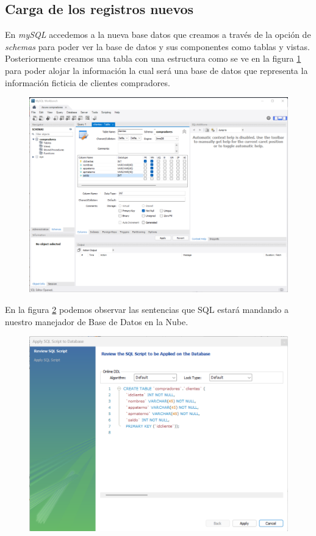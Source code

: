 \documentclass[12pt,a4paper]{article}
\begin{document}
\subsection{Carga de los registros nuevos}

En \textit{mySQL} accedemos a la nueva base datos que creamos a través de la opción de \textit{schemas} para poder ver la base de datos y sus componentes como tablas y vistas. Posteriormente creamos una tabla con una estructura como se ve en la figura \ref{fig:1_3_1_Azure_DBMS} para poder alojar la información la cual será una base de datos que representa la información ficticia de clientes compradores.

\begin{figure}[H]
    \centering
    \includegraphics[width=.6\linewidth]{M4_Servicios_Cómputo_en_la_Nube/Tarea_6_Creación_sistema_administración_Base_de_Datos/reporte/figuras/1_3_1_Azure_DBMS.png}
    \label{fig:1_3_1_Azure_DBMS}
\end{figure}


En la figura \ref{fig:1_3_2_Azure_DBMS} podemos observar las sentencias que SQL estará mandando a nuestro manejador de Base de Datos en la Nube.

\begin{figure}[H]
    \centering
    \includegraphics[width=.6\linewidth]{M4_Servicios_Cómputo_en_la_Nube/Tarea_6_Creación_sistema_administración_Base_de_Datos/reporte/figuras/1_3_2_Azure_DBMS.png}
    \label{fig:1_3_2_Azure_DBMS}
\end{figure}
\end{document}
